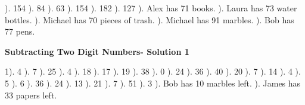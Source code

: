 \documentclass{article}%
\begin{document}
). 154%
). 84%
). 63%
). 154%
). 182%
). 127%
). Alex has 71 books.%
). Laura has 73 water bottles.%
). Michael has 70 pieces of trash.%
). Michael has 91 marbles.%
). Bob has 77 pens.%
\newline%
\newpage%
\large%
\begin{center}%
\textbf{Subtracting Two Digit Numbers- Solution 1}%
\newline%
\end{center} \normalsize%
1). 4%
). 7%
). 25%
). 4%
). 18%
). 17%
). 19%
). 38%
). 0%
). 24%
). 36%
). 40%
). 20%
). 7%
). 14%
). 4%
). 5%
). 6%
). 36%
). 24%
). 13%
). 21%
). 7%
). 51%
). 3%
). Bob has 10 marbles left.%
). James has 33 papers left.%
\end{document}
